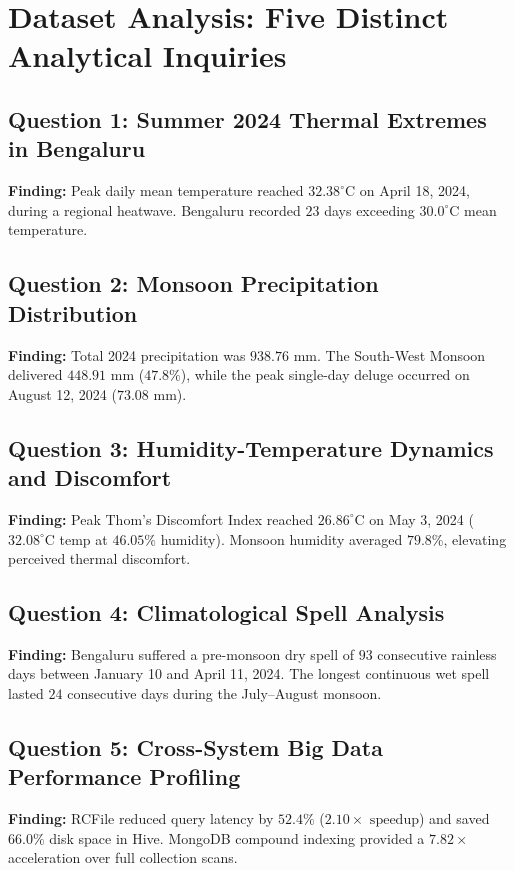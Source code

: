 \documentclass[12pt,a4paper]{article}
\begin{document}
\section{Dataset Analysis: Five Distinct Analytical Inquiries}

\subsection{Question 1: Summer 2024 Thermal Extremes in Bengaluru}
\textbf{Finding:} Peak daily mean temperature reached $32.38^\circ\text{C}$ on April 18, 2024, during a regional heatwave. Bengaluru recorded $23$ days exceeding $30.0^\circ\text{C}$ mean temperature.

\subsection{Question 2: Monsoon Precipitation Distribution}
\textbf{Finding:} Total 2024 precipitation was $938.76\text{ mm}$. The South-West Monsoon delivered $448.91\text{ mm}$ ($47.8\%$), while the peak single-day deluge occurred on August 12, 2024 ($73.08\text{ mm}$).

\subsection{Question 3: Humidity-Temperature Dynamics and Discomfort}
\textbf{Finding:} Peak Thom's Discomfort Index reached $26.86^\circ\text{C}$ on May 3, 2024 ($32.08^\circ\text{C}$ temp at $46.05\%$ humidity). Monsoon humidity averaged $79.8\%$, elevating perceived thermal discomfort.

\subsection{Question 4: Climatological Spell Analysis}
\textbf{Finding:} Bengaluru suffered a pre-monsoon dry spell of $93$ consecutive rainless days between January 10 and April 11, 2024. The longest continuous wet spell lasted $24$ consecutive days during the July--August monsoon.

\subsection{Question 5: Cross-System Big Data Performance Profiling}
\textbf{Finding:} RCFile reduced query latency by $52.4\%$ ($2.10\times\text{ speedup}$) and saved $66.0\%$ disk space in Hive. MongoDB compound indexing provided a $7.82\times$ acceleration over full collection scans.
\end{document}
